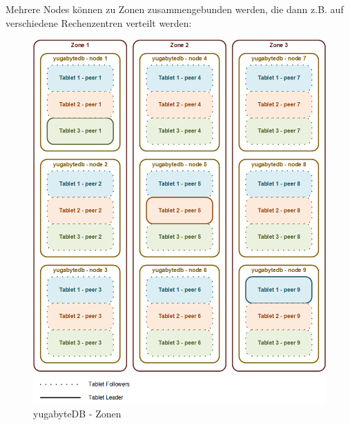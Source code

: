 \begin{flushleft}
    Mehrere Nodes können zu Zonen zusammengebunden werden, die dann z.B. auf verschiedene Rechenzentren verteilt werden:
    \begin{figure}[H]
        \centering
        \includegraphics[width=0.8\linewidth]{source/implementation/evaluation/postgresql_ha_solutions/yugabytedb/yugabytedb-zones}
        \caption{yugabyteDB - Zonen}
        \label{fig:yugabytedb-zones}
    \end{figure}
\end{flushleft}
